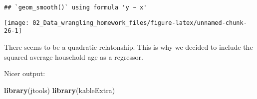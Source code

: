 \documentclass[
]{article}
\newenvironment{Shaded}{\begin{snugshade}}{\end{snugshade}}
\newcommand{\DataTypeTok}[1]{\textcolor[rgb]{0.13,0.29,0.53}{#1}}
\newcommand{\DecValTok}[1]{\textcolor[rgb]{0.00,0.00,0.81}{#1}}
\newcommand{\KeywordTok}[1]{\textcolor[rgb]{0.13,0.29,0.53}{\textbf{#1}}}
\newcommand{\NormalTok}[1]{#1}
\newcommand{\OperatorTok}[1]{\textcolor[rgb]{0.81,0.36,0.00}{\textbf{#1}}}
\newcommand{\StringTok}[1]{\textcolor[rgb]{0.31,0.60,0.02}{#1}}
\begin{document}
\begin{verbatim}
## `geom_smooth()` using formula 'y ~ x'
\end{verbatim}

\begin{center}\texttt{[image: 02\_Data\_wrangling\_homework\_files/figure-latex/unnamed-chunk-26-1]} \end{center}

There seems to be a quadratic relatonship. This is why we decided to
include the squared average household age as a regressor.

Nicer output:

\begin{Shaded}
\begin{Highlighting}[]
\KeywordTok{library}\NormalTok{(jtools)}
\KeywordTok{library}\NormalTok{(kableExtra)}
\end{Highlighting}
\end{Shaded}

\begin{Shaded}
\end{Shaded}
\end{document}
